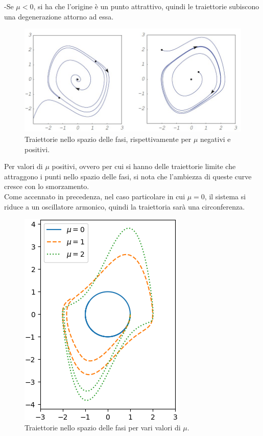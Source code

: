 \documentclass[12pt]{article}
\begin{document}
-Se $\mu<0$, si ha che l'origine è un punto attrattivo, quindi le traiettorie subiscono una degenerazione attorno ad essa. \\
\begin{figure}[H]
	\centering
	\includegraphics[scale=0.7]{Traiettorie}
	\caption{Traiettorie nello spazio delle fasi, rispettivamente per $\mu$ negativi e positivi.}
\end{figure}
Per valori di $\mu$ positivi, ovvero per cui si hanno delle traiettorie limite che attraggono i punti nello spazio delle fasi, si nota che l'ambiezza di queste curve cresce con lo smorzamento. \\
Come accennato in precedenza, nel caso particolare in cui $\mu = 0$, il sistema si riduce a un oscillatore armonico, quindi la traiettoria sarà una circonferenza.
\begin{figure}[H]
	\centering
	\includegraphics[scale=1]{Vari smorzamenti} 
	\caption{Traiettorie nello spazio delle fasi per vari valori di $\mu$.}
\end{figure} 
\end{document}
